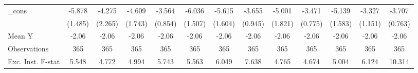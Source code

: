 {\begin{tabular}{l*{12}{c}}
\addlinespace
\_cons      &      -5.878\sym{***}&      -4.275\sym{*}  &      -4.609\sym{**} &      -3.564\sym{***}&      -6.036\sym{***}&      -5.615\sym{***}&      -3.655\sym{***}&      -5.001\sym{**} &      -3.471\sym{***}&      -5.139\sym{***}&      -3.327\sym{***}&      -3.707\sym{***}\\
            &     (1.485)         &     (2.265)         &     (1.743)         &     (0.854)         &     (1.507)         &     (1.604)         &     (0.945)         &     (1.821)         &     (0.775)         &     (1.583)         &     (1.151)         &     (0.763)         \\
\midrule
Mean Y      &       -2.06         &       -2.06         &       -2.06         &       -2.06         &       -2.06         &       -2.06         &       -2.06         &       -2.06         &       -2.06         &       -2.06         &       -2.06         &       -2.06         \\
Observations&         365         &         365         &         365         &         365         &         365         &         365         &         365         &         365         &         365         &         365         &         365         &         365         \\
Exc. Inst. F-stat&       5.548         &       4.772         &       4.994         &       5.743         &       5.563         &       6.049         &       7.638         &       4.765         &       4.674         &       5.004         &       6.124         &      10.314         \\
\bottomrule
\end{tabular}
}
